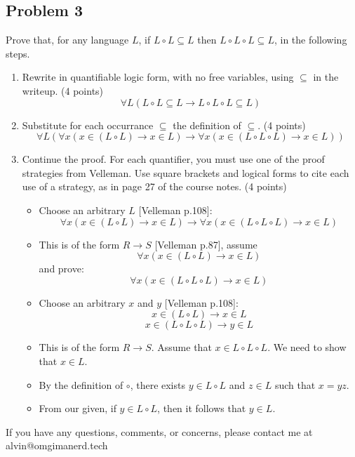\documentclass[letterpaper, 12pt]{math}
\begin{document}
\subsection*{Problem 3}
Prove that, for any language \( L \), if \( L\circ L \subseteq L \) then
\( L \circ L \circ L \subseteq L \), in the following steps.
\begin{enumerate}
  \item Rewrite in quantifiable logic form, with no free variables, using
    \( \subseteq \) in the writeup. (4 points)
    \[ \forall{L}(L\circ L\subseteq L \to L\circ L\circ L\subseteq L) \]
  \item Substitute for each occurrance \( \subseteq \) the definition of
    \( \subseteq \). (4 points)
    \[ \forall{L}(\forall{x}(x\in(L\circ L)\to x\in L)\to
      \forall{x}(x\in(L\circ L\circ L)\to x\in L)) \]
  \item Continue the proof. For each quantifier, you must use one of the proof
    strategies from Velleman. Use square brackets and logical forms to cite
    each use of a strategy, as in page 27 of the course notes. (4 points)
    \begin{itemize}
      \item Choose an arbitrary \( L \) [Velleman p.108]:
      \[ \forall{x}(x\in(L\circ L)\to x\in L)\to
        \forall{x}(x\in(L\circ L\circ L)\to x\in L) \]
      \item This is of the form \( R\to S \) [Velleman p.87], assume
      \[ \forall{x}(x\in(L\circ L)\to x\in L) \]
      and prove:
      \[ \forall{x}(x\in(L\circ L\circ L)\to x\in L) \]
      \item Choose an arbitrary \( x \) and \( y \) [Velleman p.108]:
      \[ x\in(L\circ L)\to x\in L \]
      \[ x\in(L\circ L\circ L)\to y\in L \]
      \item This is of the form \( R\to S \). Assume that
        \( x\in L\circ L\circ L \). We need to show that \( x\in L \).
      \item By the definition of \( \circ \), there exists \( y\in L\circ L \)
        and \( z\in L \) such that \( x = yz \).
      \item From our given, if \( y\in L\circ L \), then it follows that
        \( y\in L \).
    \end{itemize}
\end{enumerate}

\begin{center}
  If you have any questions, comments, or concerns, please contact me at
  alvin@omgimanerd.tech
\end{center}
\end{document}
